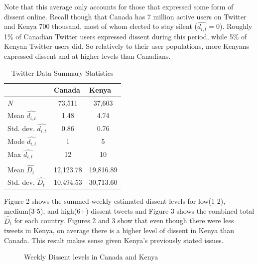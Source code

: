 \documentclass[12pt]{article}
\begin{document}
\begin{spacing}{1.5}
Note that this average only accounts for those that expressed some form of dissent online. Recall though that Canada has 7 million active users on Twitter and Kenya 700 thousand, most of whom elected to stay silent ($\hat{d_{i,t}}=0$). Roughly 1\% of Canadian Twitter users expressed dissent during this period, while 5\% of Kenyan Twitter users did. So relatively to their user populations, more Kenyans expressed dissent and at higher levels than Canadians.      

\begin{spacing}{1}
\begin{table}[]
\centering
\begin{tabular}{lcc}
\toprule
\multicolumn{1}{l}{} & \multicolumn{1}{l}{\textbf{Canada}} & \multicolumn{1}{l}{\textbf{Kenya}} \\ \hline
\textit{N} & 73,511 & 37,603 \\
Mean $\hat{d_{i,t}}$ & 1.48 & 4.74 \\
Std. dev. $\hat{d_{i,t}}$ & 0.86 & 0.76 \\
Mode $\hat{d_{i,t}}$ & 1 & 5 \\
Max $\hat{d_{i,t}}$ & 12 & 10 \\
& & \\
Mean $\hat{D_t}$ & 12,123.78 & 19,816.89 \\
Std. dev. $\hat{D_t}$ & 10,494.53 & 30,713.60 \\
\hline
\end{tabular}
\caption{Twitter Data Summary Statistics}
\end{table}
\end{spacing}

Figure 2 shows the summed weekly estimated dissent levels for low(1-2), medium(3-5), and high(6+) dissent tweets and Figure 3 shows the combined total $\hat{D_t}$ for each country. Figures 2 and 3 show that even though there were less tweets in Kenya, on average there is a higher level of dissent in Kenya than Canada. This result makes sense given Kenya's previously stated issues. 

\begin{figure}[htb]
\centering 
{}
\caption{Weekly Dissent levels in Canada and Kenya}
\end{figure}


\end{spacing}
\end{document}
